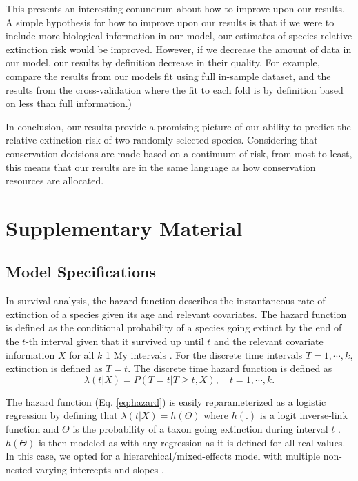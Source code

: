 \documentclass[12pt,letterpaper]{article}
\newcommand{\beginsupplement}{
  \setcounter{table}{0}
  \renewcommand{\thetable}{S\arabic{table}}
  \setcounter{figure}{0}
  \renewcommand{\thefigure}{S\arabic{figure}}
  \setcounter{equation}{0}
  \renewcommand{\theequation}{S\arabic{equation}}
}
\begin{document}
This presents an interesting conundrum about how to improve upon our results. A simple hypothesis for how to improve upon our results is that if we were to include more biological information in our model, our estimates of species relative extinction risk would be improved. However, if we decrease the amount of data in our model, our results by definition decrease in their quality. For example, compare the results from our models fit using full in-sample dataset, and the results from the cross-validation where the fit to each fold is by definition based on less than full information.)



In conclusion, our results provide a promising picture of our ability to predict the relative extinction risk of two randomly selected species. Considering that conservation decisions are made based on a continuum of risk, from most to least, this means that our results are in the same language as how conservation resources are allocated.







\section{Supplementary Material}
\beginsupplement

\subsection{Model Specifications} \label{sec:model_desc}

In survival analysis, the hazard function describes the instantaneous rate of extinction of a species given its age and relevant covariates. The hazard function is defined as the conditional probability of a species going extinct by the end of the \(t\)-th interval given that it survived up until \(t\) and the relevant covariate information \(X\) for all \(k\) 1 My intervals \citep{Tutz2016}. For the discrete time intervals \(T = 1, \cdots, k\), extinction is defined as \(T = t\). The discrete time hazard function is defined as
\begin{equation}
  \lambda(t | X) = P(T = t | T \geq t, X), \quad t = 1, \cdots, k.
  \label{eq:hazard}
\end{equation}

The hazard function (Eq. \ref{eq:hazard}) is easily reparameterized as a logistic regression by defining that \(\lambda(t | X) = h(\Theta)\) where \(h(.)\) is a logit inverse-link function and \(\Theta\) is the probability of a taxon going extinction during interval \(t\) \citep{Tutz2016}. \(h(\Theta)\) is then modeled as with any regression as it is defined for all real-values. In this case, we opted for a hierarchical/mixed-effects model with multiple non-nested varying intercepts and slopes \citep{ARM}.
\end{document}
